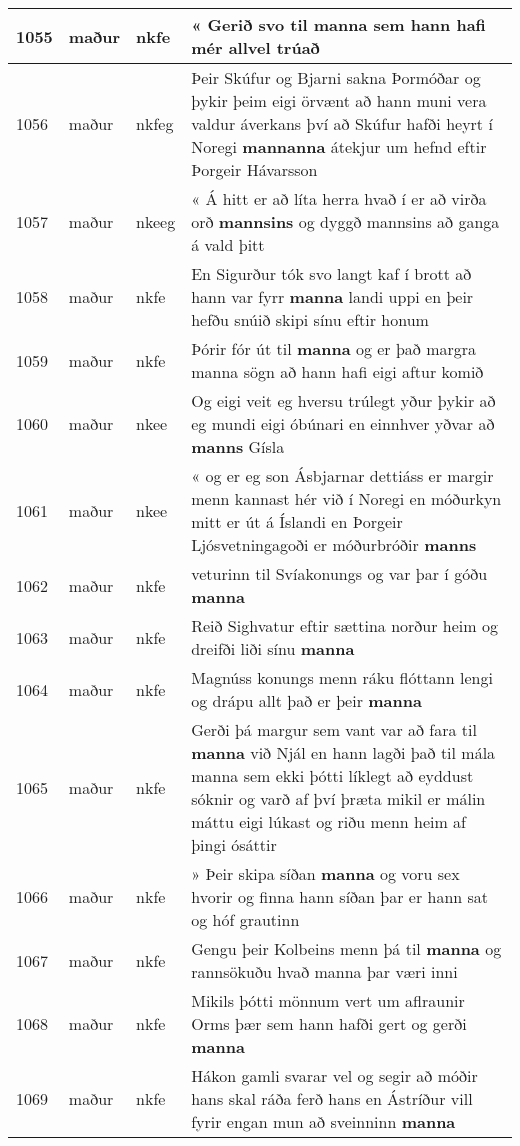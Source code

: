 \documentclass{article}
\begin{document}
\begin{longtable}{p{1cm}|p{1cm}|p{1cm}|p{13cm}}
\hline
1055&maður&nkfe&« Gerið svo til \textbf{manna} sem hann hafi mér allvel trúað\\
\hline
1056&maður&nkfeg&Þeir Skúfur og Bjarni sakna Þormóðar og þykir þeim eigi örvænt að hann muni vera valdur áverkans því að Skúfur hafði heyrt í Noregi \textbf{mannanna} átekjur um hefnd eftir Þorgeir Hávarsson\\
\hline
1057&maður&nkeeg&« Á hitt er að líta herra hvað í er að virða orð \textbf{mannsins} og dyggð mannsins að ganga á vald þitt\\
\hline
1058&maður&nkfe&En Sigurður tók svo langt kaf í brott að hann var fyrr \textbf{manna} landi uppi en þeir hefðu snúið skipi sínu eftir honum\\
\hline
1059&maður&nkfe&Þórir fór út til \textbf{manna} og er það margra manna sögn að hann hafi eigi aftur komið\\
\hline
1060&maður&nkee&Og eigi veit eg hversu trúlegt yður þykir að eg mundi eigi óbúnari en einnhver yðvar að \textbf{manns} Gísla\\
\hline
1061&maður&nkee&« og er eg son Ásbjarnar dettiáss er margir menn kannast hér við í Noregi en móðurkyn mitt er út á Íslandi en Þorgeir Ljósvetningagoði er móðurbróðir \textbf{manns} \\
\hline
1062&maður&nkfe&veturinn til Svíakonungs og var þar í góðu \textbf{manna} \\
\hline
1063&maður&nkfe&Reið Sighvatur eftir sættina norður heim og dreifði liði sínu \textbf{manna} \\
\hline
1064&maður&nkfe&Magnúss konungs menn ráku flóttann lengi og drápu allt það er þeir \textbf{manna} \\
\hline
1065&maður&nkfe&Gerði þá margur sem vant var að fara til \textbf{manna} við Njál en hann lagði það til mála manna sem ekki þótti líklegt að eyddust sóknir og varð af því þræta mikil er málin máttu eigi lúkast og riðu menn heim af þingi ósáttir\\
\hline
1066&maður&nkfe&» Þeir skipa síðan \textbf{manna} og voru sex hvorir og finna hann síðan þar er hann sat og hóf grautinn\\
\hline
1067&maður&nkfe&Gengu þeir Kolbeins menn þá til \textbf{manna} og rannsökuðu hvað manna þar væri inni\\
\hline
1068&maður&nkfe&Mikils þótti mönnum vert um aflraunir Orms þær sem hann hafði gert og gerði \textbf{manna} \\
\hline
1069&maður&nkfe&Hákon gamli svarar vel og segir að móðir hans skal ráða ferð hans en Ástríður vill fyrir engan mun að sveinninn \textbf{manna} \\

\end{longtable}
\end{document}
